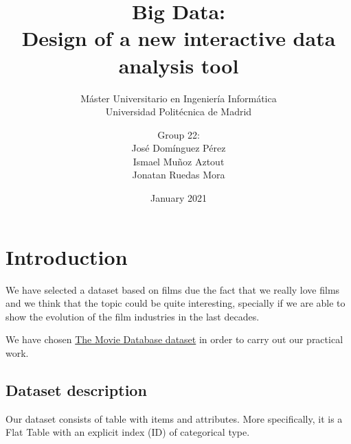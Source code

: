 

\title{Big Data:\\ Design of a new interactive data analysis tool}
\subtitle{Máster Universitario en Ingeniería Informática\\
		  Universidad Politécnica de Madrid}
\author{Group 22:\\
		José Domínguez Pérez\\
		Ismael Muñoz Aztout\\
		Jonatan Ruedas Mora}
\date{January 2021}

\makeindex

\maketitle
\tableofcontents
\newpage

\section{Introduction}

We have selected a dataset based on films due the fact that we really love films and we think that the topic could be quite interesting, specially if we are able to show the evolution of the film industries in the last decades.

We have chosen \href{https://www.kaggle.com/tmbd/tmdb-movie-metadata?select=tmdb_5000_movies.csv}{The Movie Database dataset} in order to carry out our practical work.

\subsection{Dataset description}
Our dataset consists of table with items and attributes. More specifically, it is a Flat Table with an explicit index (ID) of categorical type. 

